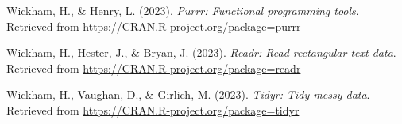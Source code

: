 \documentclass[
  man,floatsintext]{apa6}
\newlength{\cslhangindent}
\newlength{\cslentryspacingunit} %
\newenvironment{CSLReferences}[2] %
 {%
  \setlength{\parindent}{0pt}
  \ifodd #1
  \let\oldpar\par
  \def\par{\hangindent=\cslhangindent\oldpar}
  \fi
  \setlength{\parskip}{#2\cslentryspacingunit}
 }%
 {}
\begin{document}
\begin{CSLReferences}{1}{0}
\leavevmode{}%
Wickham, H., \& Henry, L. (2023). \emph{Purrr: Functional programming tools}. Retrieved from \url{https://CRAN.R-project.org/package=purrr}

\leavevmode{}%
Wickham, H., Hester, J., \& Bryan, J. (2023). \emph{Readr: Read rectangular text data}. Retrieved from \url{https://CRAN.R-project.org/package=readr}

\leavevmode{}%
Wickham, H., Vaughan, D., \& Girlich, M. (2023). \emph{Tidyr: Tidy messy data}. Retrieved from \url{https://CRAN.R-project.org/package=tidyr}

\end{CSLReferences}
\end{document}
